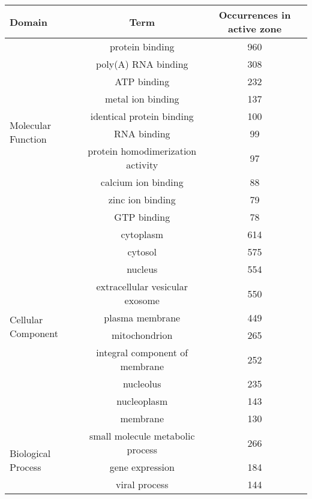 \begin{table}
    \centering
    \begin{tabular}{l c c}
        Domain              & Term                      & Occurrences in active zone \\
        \hline
        \multirow{10}{*}{Molecular Function}  & protein binding           & 960 \\
                            & poly(A) RNA binding       & 308 \\
                            & ATP binding               & 232  \\
                            & metal ion binding         & 137 \\
                            & identical protein binding & 100 \\
                            & RNA binding               & 99 \\
                            & protein homodimerization activity & 97 \\
                            & calcium ion binding & 88 \\
                            & zinc ion binding & 79 \\
                            & GTP binding & 78 \\
        \hline
        \multirow{10}{*}{Cellular Component}  & cytoplasm & 614 \\
                            & cytosol & 575 \\
                            & nucleus & 554 \\
                            & extracellular vesicular exosome & 550 \\
                            & plasma membrane & 449 \\
                            & mitochondrion & 265 \\
                            & integral component of membrane & 252 \\
                            & nucleolus & 235 \\
                            & nucleoplasm & 143 \\
                            & membrane & 130 \\
        \hline
        \multirow{10}{*}{Biological Process}  & small molecule metabolic process & 266 \\
                            & gene expression & 184 \\
                            & viral process & 144 \\

\end{tabular}
\end{table}
